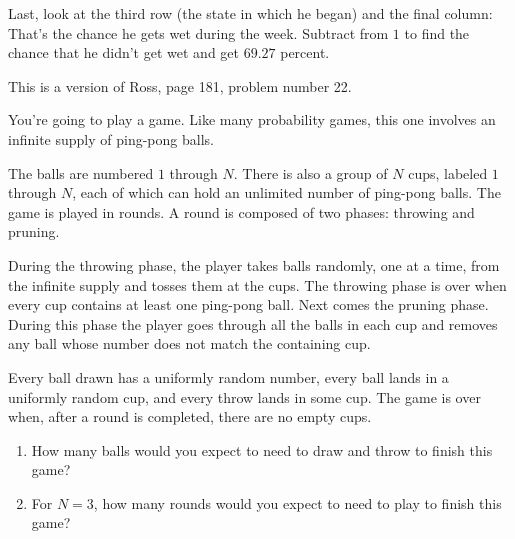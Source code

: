 \documentclass[12pt]{article}
\begin{document}
\begin{solution}
    Last, look at the third row (the state in which he began) and the
    final column:  That’s the chance he gets wet during the week.
    Subtract from \( 1 \) to find the chance that he didn’t get wet
    and get \( 69.27 \) percent.

    \begin{remark}
        This is a version of Ross, page 181, problem number 22.
    \end{remark}
\end{solution}
\begin{exercise}
    You’re going to play a game.  Like many probability games, this
    one involves an infinite supply of ping-pong balls.

    The balls are numbered \( 1 \) through \( N \).  There is also a
    group of \( N \) cups, labeled \( 1 \) through \( N \), each of
    which can hold an unlimited number of ping-pong balls.  The game is
    played in rounds. A round is composed of two phases:  throwing and
    pruning.

    During the throwing phase, the player takes balls randomly, one at a
    time, from the infinite supply and tosses them at the cups.  The
    throwing phase is over when every cup contains at least one
    ping-pong ball.  Next comes the pruning phase.  During this phase
    the player goes through all the balls in each cup and removes any
    ball whose number does not match the containing cup.

    Every ball drawn has a uniformly random number, every ball lands in
    a uniformly random cup, and every throw lands in some cup.  The game
    is over when, after a round is completed, there are no empty cups.

    \begin{enumerate}[label=(\alph*)]
    \item
        How many balls would you expect to need to draw and throw to
        finish this game?
    \item
        For \( N = 3 \), how many rounds would you expect to need to
        play to finish this game?
\end{enumerate}
\end{exercise}
\end{document}

